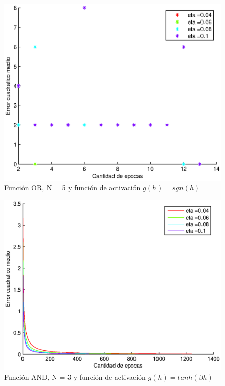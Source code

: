 \documentclass{sig-alternate}
\begin{document}
\begin{figure}[!ht]
	\includegraphics[scale=0.5]{images/PuriOr/OR_N5_err001_step.eps}
  \caption{Funci\'on OR, N = 5 y funci\'on de activaci\'on $g(h) = sgn(h)$}
  \label{fig:step}
\end{figure}

\begin{figure}[!ht]
	\includegraphics[scale=0.5]{images/PuriAnd/AND_N3_err001_tanh.eps}
  \caption{Funci\'on AND, N = 3 y funci\'on de activaci\'on $g(h) = tanh(\beta h)$}
  \label{fig:tanh}
\end{figure}
\end{document}
